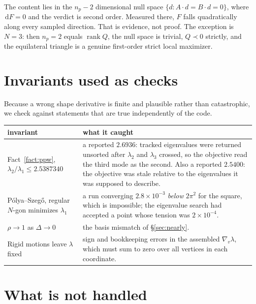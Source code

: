 \documentclass[11pt]{article}
\newcommand{\dd}{\,\mathrm{d}}
\theoremstyle{definition}
\begin{document}
The content lies in the $n_p-2$ dimensional null space $\{d:A\!\cdot\!d=B\!\cdot\!d=0\}$, where
$\dd F=0$ and the verdict is second order. Measured there, $F$ falls quadratically along every
sampled direction. That is evidence, not proof. The exception is $N=3$: then $n_p=2$ equals
$\operatorname{rank}Q$, the null space is trivial, $Q\prec0$ strictly, and the equilateral
triangle is a genuine first-order strict local maximizer.

\section{Invariants used as checks}

Because a wrong shape derivative is finite and plausible rather than catastrophic, we check
against statements that are true independently of the code.

\begin{center}
\begin{tabularx}{\textwidth}{@{}lL@{}}
\toprule
invariant & what it caught \\
\midrule
Fact~\ref{fact:ppw}, $\lambda_2/\lambda_1\le2.5387340$
  & a reported $2.6936$: tracked eigenvalues were returned unsorted after $\lambda_2$ and
    $\lambda_3$ crossed, so the objective read the third mode as the second. Also a reported
    $2.5400$: the objective was stale relative to the eigenvalues it was supposed to describe. \\
P\'olya--Szeg\H{o}, regular $N$-gon minimizes $\lambda_1$
  & a run converging $2.8\times10^{-3}$ \emph{below} $2\pi^2$ for the square, which is
    impossible; the eigenvalue search had accepted a point whose tension was
    $2\times10^{-4}$. \\
$\rho\to1$ as $\Delta\to0$
  & the basis mismatch of \S\ref{sec:nearly}. \\
Rigid motions leave $\lambda$ fixed
  & sign and bookkeeping errors in the assembled $\nabla_v\lambda$, which must sum to zero over
    all vertices in each coordinate. \\
\bottomrule
\end{tabularx}
\end{center}

\section{What is not handled}
\end{document}
